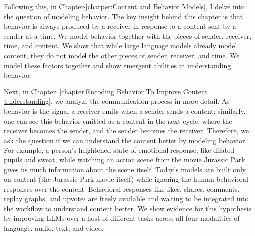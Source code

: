 \documentclass[PhD]{iiitd}
\renewcommand{\cite}[1]{\citep{#1}}
\begin{document}
Following this, in Chapter-\ref{chatper:Content and Behavior Models}, I delve into the question of modeling behavior. The key insight behind this chapter is that behavior is always produced by a receiver in response to a content sent by a sender at a time. We model behavior together with the pieces of sender, receiver, time, and content. We show that while large language models already model content, they do not model the other pieces of sender, receiver, and time. We model these factors together and show emergent abilities in understanding behavior. 


Next, in Chapter~\ref{chapter:Encoding Behavior To Improve Content Understanding}, we analyze the communication process in more detail. As behavior is the signal a receiver emits when a sender sends a content; similarly, one can see this behavior emitted as a content in the next cycle, where the receiver becomes the sender, and the sender becomes the receiver. Therefore, we ask the question if we can understand the content better by modeling behavior. For example, a person's heightened state of emotional response, like dilated pupils and sweat, while watching an action scene from the movie Jurassic Park gives us much information about the scene itself. Today's models are built only on content (the Jurassic Park movie itself) while ignoring the human behavioral responses over the content. Behavioral responses like likes, shares, comments, replay graphs, and upvotes are freely available and waiting to be integrated into the workflow to understand content better. We show evidence for this hypothesis by improving LLMs over a host of different tasks across all four modalities of language, audio, text, and video. 


\end{document}
